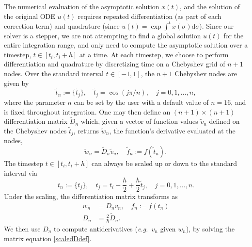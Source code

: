 \documentclass[10pt]{article}
\newcommand{\be}{\begin{equation}}
\newcommand{\ee}{\end{equation}}
\newcommand{\eg}{{\it e.g.\ }}
\begin{document}
The numerical evaluation of the asymptotic solution $x(t)$, and the solution of
the original ODE $u(t)$ requires repeated differentiation (as part of each
correction term) and quadrature (since $u(t) = \exp \int^t x(\sigma)
\mathrm{d}\sigma$). 
Since our solver is a stepper, we are not attempting to find a global solution
$u(t)$ for the entire integration range, and only need to compute the
asymptotic solution over a timestep, $t \in [t_i, t_i+h]$ at a time. At each 
timestep, we choose to perform differentiation and quadrature by discretizing
time on a Chebyshev grid of $n + 1$ nodes.  
Over the standard interval $t \in [-1, 1]$, the $n+1$ Chebyshev nodes are given by 
\be\label{chebnodes}
\tilde{t}_n := \{\tilde{t}_j\}, \quad \tilde{t}_j = \cos\left( j\pi/n\right), \quad j = 0, 1, \ldots, n,
\ee
where the parameter $n$ can be set by the user with a default value of $n = 16$, and is fixed throughout integration. 
One may then define an $(n+1) \times (n+1)$ differentiation matrix $\tilde{D}_n$ which, given a vector of function
values $\tilde{v}_n$ defined on the Chebyshev nodes $\tilde{t}_j$, returns $\tilde{w}_n$, the function's
derivative evaluated at the nodes,
\be\label{diffmat}
\tilde{w}_n = \tilde{D}_n\tilde{v}_n, \quad \tilde{f}_n := f(\tilde{t}_n),
\ee
The timestep $t \in [t_i, t_i+h]$ can always be scaled up or down to the standard interval via
\be\label{scaledt}
t_n := \{ t_j \}, \quad t_j = t_i + \frac{h}{2} + \frac{h}{2}\tilde{t}_j, \quad j = 0, 1, \ldots, n. 
\ee
Under the scaling, the differentiation matrix transforms as
\begin{align}
    w_n &= D_nv_n, \quad f_n := f(t_n) \label{scaledDdef}\\
    D_n &= \frac{2}{h}\tilde{D}_n. \label{scaledD}
\end{align}
We then use $D_n$ to compute antiderivatives (\eg $v_n$ given $w_n$), by
solving the matrix equation \cref{scaledDdef}. 

\end{document}
